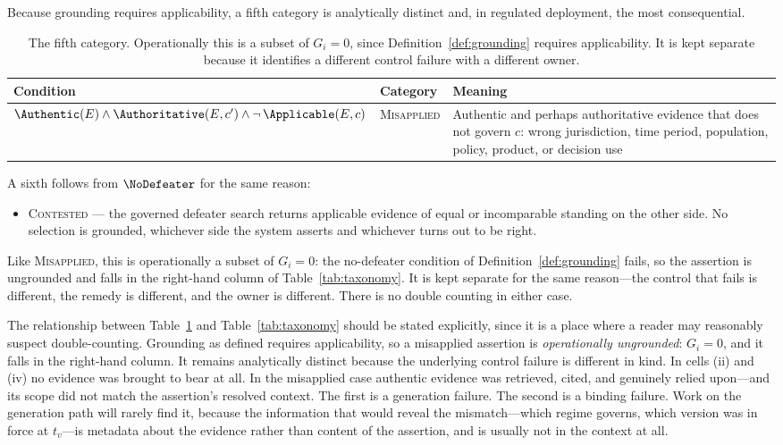 Because grounding requires applicability, a fifth category is analytically
distinct and, in regulated deployment, the most consequential.

\begin{table}[ht]
  \centering
  \begin{tabular}{@{}>{\raggedright\arraybackslash}p{5.6cm}>{\raggedright\arraybackslash}p{2.2cm}>{\raggedright\arraybackslash}p{5.4cm}@{}}
    \toprule
    Condition & Category & Meaning \\
    \midrule
    $\Authentic(E) \wedge \Authoritative(E, c') \wedge \neg\,\Applicable(E, c)$
      & \textsc{Misapplied}
      & Authentic and perhaps authoritative evidence that does not govern $c$:
        wrong jurisdiction, time period, population, policy, product, or decision
        use \\
    \bottomrule
  \end{tabular}
  \caption{The fifth category. Operationally this is a subset of
    $G_i = 0$, since Definition~\ref{def:grounding} requires applicability. It is
    kept separate because it identifies a different control failure with a
    different owner.}
  \label{tab:misapplied}
\end{table}

A sixth follows from $\NoDefeater$ for the same reason:

\begin{itemize}
  \item[\textsc{(vi)}] \textsc{Contested} --- the governed defeater search returns
        applicable evidence of equal or incomparable standing on the other side. No
        selection is grounded, whichever side the system asserts and whichever turns out
        to be right.
\end{itemize}

Like \textsc{Misapplied}, this is operationally a subset of $G_i = 0$: the no-defeater
condition of Definition~\ref{def:grounding} fails, so the assertion is ungrounded and
falls in the right-hand column of Table~\ref{tab:taxonomy}. It is kept separate for the
same reason---the control that fails is different, the remedy is different, and the
owner is different. There is no double counting in either case.

The relationship between Table~\ref{tab:misapplied} and Table~\ref{tab:taxonomy}
should be stated explicitly, since it is a place where a reader may reasonably
suspect double-counting. Grounding as defined requires applicability, so a
misapplied assertion is \emph{operationally ungrounded}: $G_i = 0$, and it falls in
the right-hand column. It remains analytically distinct because the underlying
control failure is different in kind. In cells (ii) and (iv) no evidence was
brought to bear at all. In the misapplied case authentic evidence was retrieved,
cited, and genuinely relied upon---and its scope did not match the assertion's
resolved context. The first is a generation failure. The second is a binding
failure. Work on the generation path will rarely find it, because the information that
would reveal the mismatch---which regime governs, which version was in force at
$t_v$---is metadata about the evidence rather than content of the assertion, and is
usually not in the context at all.

